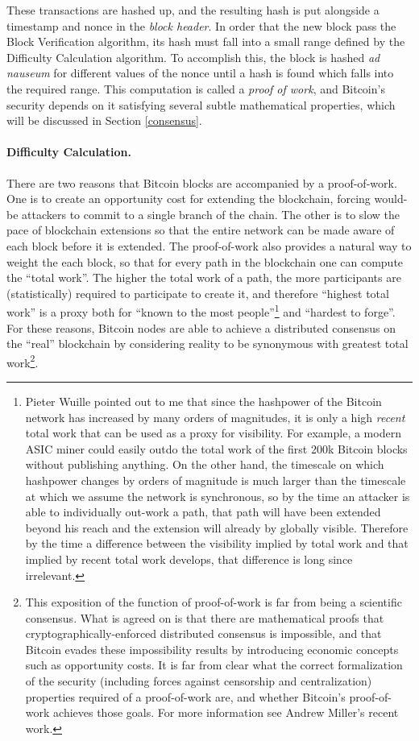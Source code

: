 \documentclass[letterpaper]{article}
\begin{document}
These transactions are hashed up, and the resulting hash is put
alongside a timestamp and nonce in the \emph{block header}. In order
that the new block pass the Block Verification algorithm, its hash must
fall into a small range defined by the Difficulty Calculation algorithm.
To accomplish this, the block is hashed \emph{ad nauseum} for different
values of the nonce until a hash is found which falls into the required
range. This computation is called a \emph{proof of work}, and Bitcoin's
security depends on it satisfying several subtle mathematical properties,
which will be discussed in Section \ref{consensus}.

\paragraph{Difficulty Calculation.}

There are two reasons that Bitcoin blocks are accompanied by a proof-of-work.
One is to create an opportunity cost for extending the blockchain, forcing
would-be attackers to commit to a single branch of the chain. The other is
to slow the pace of blockchain extensions so that the entire network can be
made aware of each block before it is extended. The proof-of-work also provides
a natural way to weight the each block, so that for every path in the blockchain
one can compute the ``total work''. The higher the total work of a path, the more
participants are (statistically) required to participate to create it, and
therefore ``highest total work'' is a proxy both for ``known to the most
people''\footnote{Pieter Wuille pointed out to me that since the hashpower of
the Bitcoin network has increased by many orders of magnitudes, it is only a
high \emph{recent} total work that can be used as a proxy for visibility. For
example, a modern ASIC miner could easily outdo the total work of the first
200k Bitcoin blocks without publishing anything. On the other hand, the timescale
on which hashpower changes by orders of magnitude is much larger than the timescale
at which we assume the network is synchronous, so by the time an attacker is able
to individually out-work a path, that path will have been extended beyond his reach
and the extension will already by globally visible. Therefore by the time a
difference between the visibility implied by total work and that implied by recent
total work develops, that difference is long since irrelevant.}
and ``hardest to forge''. For these reasons, Bitcoin nodes are able to
achieve a distributed consensus on the ``real'' blockchain by considering
reality to be synonymous with greatest total work\footnote{This exposition of
the function of proof-of-work is far from being a scientific consensus. What
is agreed on is that there are mathematical proofs that cryptographically-enforced
distributed consensus is impossible, and that Bitcoin evades these impossibility
results by introducing economic concepts such as opportunity costs. It is far
from clear what the correct formalization of the security (including forces
against censorship and centralization) properties required of a proof-of-work
are, and whether Bitcoin's proof-of-work achieves those goals. For more information
see Andrew Miller's recent work.}.
\end{document}
